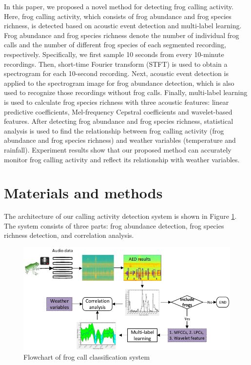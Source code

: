 In this paper, we proposed a novel method for detecting frog calling activity. Here, frog calling activity, which consists of frog abundance and frog species richness, is detected based on acoustic event detection and multi-label learning. Frog abundance and frog species richness denote the number of individual frog calls and the number of different frog species of each segmented recording, respectively. Specifically, we first sample 10 seconds from every 10-minute recordings. Then, short-time Fourier transform (STFT) is used to obtain a spectrogram for each 10-second recording. Next, acoustic event detection is applied to the spectrogram image for frog abundance detection, which is also used to recognize those recordings without frog calls. Finally, multi-label learning is used to calculate frog species richness with three acoustic features: linear predictive coefficients, Mel-frequency Cepstral coefficients and wavelet-based features. After detecting frog abundance and  frog species richness, statistical analysis is used to find the relationship between frog calling activity (frog abundance and frog species richness) and weather variables (temperature and rainfall). Experiment results show that our proposed method can accurately monitor frog calling activity and reflect its relationship with weather variables.


\section{Materials and methods}
The architecture of our calling activity detection system is shown in Figure \ref{fig:Ch7_flowchart}. The system consists of three parts: frog abundance detection, frog species richness detection, and correlation analysis.

\begin{figure}[htb!]
\centering
\includegraphics[width=\textwidth]{image/Ch7/flowchart.pdf}
\caption{Flowchart of frog call classification system}
\label{fig:Ch7_flowchart}
\end{figure}



